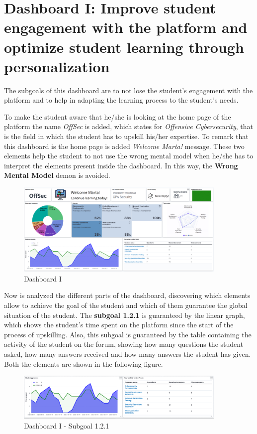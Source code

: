 \section{Dashboard I: Improve student engagement with the platform and optimize student learning through personalization}

The subgoals of this dashboard are to not lose the student's engagement with 
the platform and to help in adapting the learning process to the student's
needs. 

To make the student aware that he/she is looking
at the home page of the platform the name \textit{OffSec} is added,
which states for \textit{Offensive Cybersecurity}, that is the field
in which the student has to upskill his/her expertise. To remark that this
dashboard is the home page is added \textit{Welcome Marta!} message.
These two elements help the student to not use the wrong mental model
when he/she has to interpret the elements present inside the dashboard.
In this way, the \textbf{Wrong Mental Model} demon is avoided.

\begin{figure}[H]
    \centering
    \includegraphics[width=0.9\textwidth]{assets/dashboard_1.png}
    \caption{Dashboard I}
    \label{fig:dashboard_1}
\end{figure}

Now is analyzed the different parts of the dashboard, discovering which
elements allow to achieve the goal of the student and which of them guarantee the
global situation of the student. The \textbf{subgoal 1.2.1} is guaranteed by the linear graph,
which shows the student's time spent on the platform since the start of
the process of upskilling. Also, this subgoal is guaranteed by the table containing the activity of the
student on the forum, showing how many questions the student asked, how many
answers received and how many answers the student has given. 
Both the elements are shown in the following figure.

\begin{figure}[H]
    \centering
    \includegraphics[width=0.9\textwidth]{assets/dashboard_1_121.png}
    \caption{Dashboard I - Subgoal 1.2.1}
    \label{fig:dashboard_1_subgoal_121}
\end{figure}


